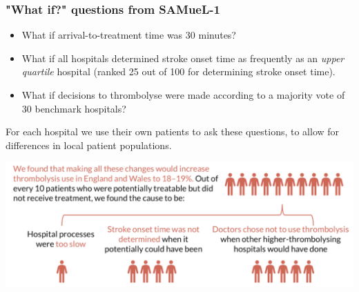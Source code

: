 \documentclass[xcolor={usenames,dvipsnames}]{beamer}
\begin{document}


\begin{frame}
\frametitle{"What if?" questions from SAMueL-1}


\begin{itemize}
    \footnotesize
    \item What if arrival-to-treatment time was 30 minutes?
    \item What if all hospitals determined stroke onset time as frequently as an \emph{upper quartile} hospital (ranked 25 out of 100 for determining stroke onset time).
    \item What if decisions to thrombolyse were made according to a majority vote of 30 benchmark hospitals?
\end{itemize}

\footnotesize{For each hospital we use their own patients to ask these questions, to allow for differences in local patient populations.}







\begin{center}
\includegraphics[width=1.0\textwidth]{./images/sam_summary_pt_3}
\end{center}

\end{frame}



\end{document}
